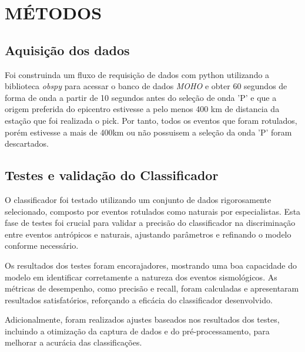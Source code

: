 \section{MÉTODOS}
\label{sec:metodos}

\subsection{Aquisição dos dados}
\label{subsec:aquisi_dado}
\par{Foi construinda um fluxo de requisição de dados com python utilizando a biblioteca \textit{obspy} para acessar o banco de dados \textit{MOHO} e obter 60 segundos de forma de onda a partir de 10 segundos antes do seleção de onda 'P' e que a origem preferida do epicentro estivesse a pelo menos 400 km de distancia da estação que foi realizada o pick. Por tanto, todos os eventos que foram rotulados, porém estivesse a mais de 400km ou não possuisem a seleção da onda 'P' foram descartados.
}

\subsection{Testes e validação do Classificador}
\label{subsec:testes_validacao}
\par{O classificador foi testado utilizando um conjunto de dados rigorosamente selecionado, composto por eventos rotulados como naturais por especialistas. Esta fase de testes foi crucial para validar a precisão do classificador na discriminação entre eventos antrópicos e naturais, ajustando parâmetros e refinando o modelo conforme necessário.}

\par{Os resultados dos testes foram encorajadores, mostrando uma boa capacidade do modelo em identificar corretamente a natureza dos eventos sismológicos. As métricas de desempenho, como precisão e recall, foram calculadas e apresentaram resultados satisfatórios, reforçando a eficácia do classificador desenvolvido.}

\par{Adicionalmente, foram realizados ajustes baseados nos resultados dos testes, incluindo a otimização da captura de dados e do pré-processamento, para melhorar a acurácia das classificações.}

